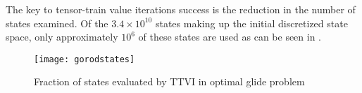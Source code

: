 The key to tensor-train value iterations success is the reduction in the number of states examined. Of the $3.4 \times 10^10$ states making up the initial discretized state space, only approximately $10^6$ of these states are used as can be seen in .\cite{Gorod}
\begin{figure}
\centering
\texttt{[image: gorodstates]}
\caption{Fraction of states evaluated by TTVI in optimal glide problem \cite{gorod}}
\label{gorodstates}
\end{figure}